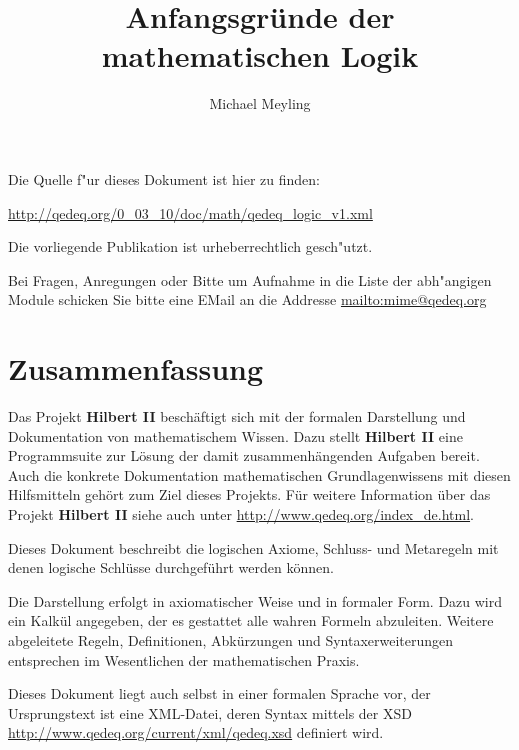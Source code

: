 \documentclass[a4paper,german,10pt,twoside]{book}
\title{Anfangsgr{\"u}nde der mathematischen Logik}
\author{
Michael Meyling
}
\theoremstyle{definition}
\theoremstyle{remark}
\begin{document}
\maketitle

\setlength{\parskip}{5pt plus 2pt minus 1pt}
\mbox{}
\vfill

\par
Die Quelle f{"ur} dieses Dokument ist hier zu finden:
\par
\url{http://qedeq.org/0_03_10/doc/math/qedeq_logic_v1.xml}

\par
Die vorliegende Publikation ist urheberrechtlich gesch{"u}tzt.
\par
Bei Fragen, Anregungen oder Bitte um Aufnahme in die Liste der abh{"a}ngigen Module schicken Sie bitte eine EMail an die Addresse \url{mailto:mime@qedeq.org}

\setlength{\parskip}{0pt}
\tableofcontents

\setlength{\parskip}{5pt plus 2pt minus 1pt}

\chapter*{Zusammenfassung} \label{chapter0} \hypertarget{chapter0}{}

Das Projekt \textbf{Hilbert II} besch{\"a}ftigt sich mit der formalen Darstellung und Dokumentation von mathematischem Wissen. Dazu stellt \textbf{Hilbert II} eine Programmsuite zur L{\"o}sung der damit zusammenh{\"a}ngenden Aufgaben bereit. Auch die konkrete Dokumentation mathematischen Grundlagenwissens mit diesen Hilfsmitteln geh{\"o}rt zum Ziel dieses Projekts. 
F{\"u}r weitere Information {\"u}ber das Projekt \textbf{Hilbert II} siehe auch unter \url{http://www.qedeq.org/index_de.html}.

\par
Dieses Dokument beschreibt die logischen Axiome, Schluss- und Metaregeln mit denen logische Schl{\"u}sse durchgef{\"u}hrt werden k{\"o}nnen.

\par
Die Darstellung erfolgt in axiomatischer Weise und in formaler Form. Dazu wird ein Kalk{\"u}l angegeben, der es gestattet alle wahren Formeln abzuleiten. Weitere abgeleitete Regeln, Definitionen, Abk{\"u}rzungen und Syntaxerweiterungen entsprechen im Wesentlichen der mathematischen Praxis.

\par
Dieses Dokument liegt auch selbst in einer formalen Sprache vor, der Ursprungstext ist eine XML-Datei, deren Syntax mittels der XSD \url{http://www.qedeq.org/current/xml/qedeq.xsd} definiert wird.
\end{document}
